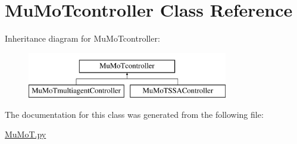 \hypertarget{class_mu_mo_t_1_1_mu_mo_tcontroller}{}\section{Mu\+Mo\+Tcontroller Class Reference}
\label{class_mu_mo_t_1_1_mu_mo_tcontroller}
Inheritance diagram for Mu\+Mo\+Tcontroller\+:\begin{figure}[H]
\begin{center}
\leavevmode
\includegraphics[height=2.000000cm]{class_mu_mo_t_1_1_mu_mo_tcontroller}
\end{center}
\end{figure}


The documentation for this class was generated from the following file\+:\begin{DoxyCompactItemize}
\item 
\hyperlink{_mu_mo_t_8py}{Mu\+Mo\+T.\+py}\end{DoxyCompactItemize}
